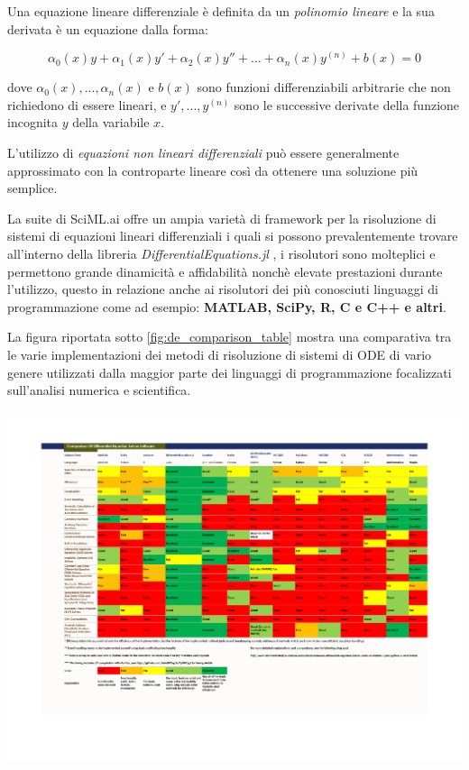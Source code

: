 Una equazione lineare differenziale è definita da un \emph{polinomio lineare} 
e la sua derivata è un equazione dalla forma:

$$\alpha_0(x)y + \alpha_1(x)y' + \alpha_2(x)y'' + ... + \alpha_n(x)y^{(n)} + b(x) = 0$$

dove $\alpha_0(x), ..., \alpha_n(x)$ e $b(x)$ sono funzioni differenziabili arbitrarie che non 
richiedono di essere lineari, e $y', ..., y^{(n)}$ sono le successive derivate della funzione incognita
$y$ della variabile $x$.

L'utilizzo di \emph{equazioni non lineari differenziali} può essere 
generalmente approssimato con la controparte lineare così da ottenere una 
soluzione più semplice. 

La suite di SciML.ai offre un ampia varietà di framework per la risoluzione di sistemi di 
equazioni lineari differenziali i quali si possono prevalentemente trovare 
all'interno della libreria \emph{DifferentialEquations.jl} \cite{rackauckas2017differentialequations}
\cite{rackauckas2019confederated} \cite{9622796} \cite{gowda2019sparsity},
i risolutori sono molteplici e permettono grande dinamicità e affidabilità 
nonchè elevate prestazioni durante l'utilizzo, questo in relazione anche ai risolutori dei più 
conosciuti linguaggi di programmazione come ad esempio: \textbf{MATLAB, SciPy, R, C e C++ e altri}.

La figura riportata sotto \ref{fig:de_comparison_table} \cite{10.15200/winn.153459.98975} mostra una comparativa tra le varie implementazioni dei 
metodi di risoluzione di sistemi di ODE di vario genere utilizzati dalla maggior
parte dei linguaggi di programmazione focalizzati sull'analisi numerica e scientifica.

\begin{minipage}{\linewidth}
    \centering
    \includegraphics[width=\textwidth]{img/de_solver_software_comparsion.pdf}
    \label{fig:de_comparison_table}
\end{minipage}

